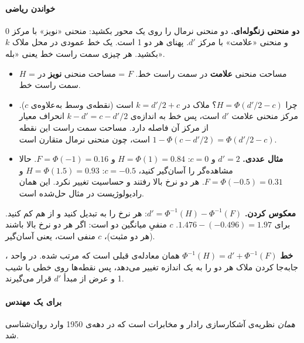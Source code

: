 \paragraph{خواندن ریاضی}

\textbf{دو منحنی زنگوله‌ای.} دو منحنی نرمال را روی یک محور بکشید: منحنی
«نویز» با مرکز 0 و منحنی «علامت» با مرکز \(d'\). پهنای هر دو 1 است. یک
خط عمودی در محل ملاک \(k\) بکشید. هر چیزی سمت راست خط یعنی «بله».

\begin{itemize}
\tightlist
\item
  \(H\) = مساحت منحنی \textbf{علامت} در سمت راست خط. \(F\) = مساحت منحنی
  \textbf{نویز} در سمت راست خط.
\item
  چرا \(H = \Phi(d'/2 - c)\)؟ ملاک در \(k = d'/2 + c\) است (نقطه‌ی وسط
  به‌علاوه‌ی \(c\)). مرکز منحنی علامت \(d'\) است، پس خط به اندازه‌ی
  \(k - d' = c - d'/2\) انحراف معیار از مرکز آن فاصله دارد. مساحت سمت
  راست این نقطه \(1 - \Phi(c - d'/2) = \Phi(d'/2 - c)\) است، چون منحنی
  نرمال متقارن است.
\item
  \textbf{مثال عددی.} \(d' = 2\) و \(c = 0\): \(H = \Phi(1) = 0.84\) و
  \(F = \Phi(-1) = 0.16\). حالا مشاهده‌گر را آسان‌گیر  کنید،
  \(c = -0.5\): \(H = \Phi(1.5) = 0.93\) و \(F = \Phi(-0.5) = 0.31\). هر
  دو نرخ بالا رفتند و حساسیت تغییر نکرد. این همان رادیولوژیست  در
  مثال حل‌شده است.
\end{itemize}

\textbf{معکوس کردن.} \(d' = \Phi^{-1}(H) - \Phi^{-1}(F)\): هر نرخ را به
 تبدیل کنید و از هم کم کنید. برای 
\(1.476 - (-0.496) = 1.97\). \(c\) منفیِ میانگین دو  است: اگر
هر دو نرخ بالا باشند (هر دو  مثبت)، \(c\) منفی است، یعنی
آسان‌گیر.

\textbf{خط } \(\Phi^{-1}(H) = d' + \Phi^{-1}(F)\) همان معادله‌ی
قبلی است که مرتب شده. در واحد ، جابه‌جا کردن ملاک هر دو
 را به یک اندازه تغییر می‌دهد، پس نقطه‌ها روی خطی با شیب 1 و
عرض از مبدأ \(d'\) قرار می‌گیرند.

\paragraph{برای یک مهندس}

 \emph{همان} نظریه‌ی آشکارسازی رادار و مخابرات است که در دهه‌ی
1950 وارد روان‌شناسی شد.

